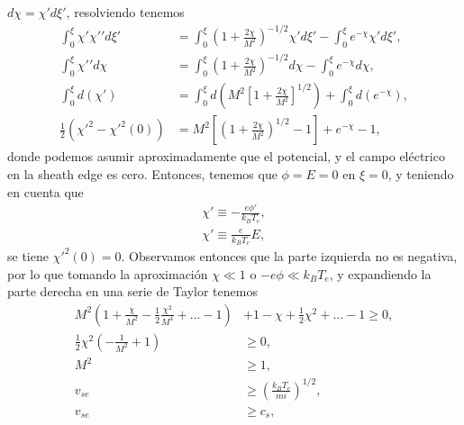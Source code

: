 \documentclass[../main.tex]{subfiles}
\begin{document}
    $d\chi = \chi\prime d\xi\prime$, resolviendo tenemos
    \begin{align}
        \int_0^{\xi}\chi\prime\chi\prime\prime d\xi\prime &= \int_0^{\xi} \left(1+\frac{2\chi}{M^2}\right)^{-1/2}\chi\prime d\xi\prime - \int_0^{\xi}e^{-\chi}\chi\prime d\xi\prime, \\
        \int_0^{\xi}\chi\prime\prime d\chi &= \int_0^{\xi} \left(1+\frac{2\chi}{M^2}\right)^{-1/2} d\chi - \int_0^{\xi}e^{-\chi} d\chi, \\
        \int_0^{\xi}d(\chi\prime) &= \int_0^{\xi} d\left(M^2\left[1+\frac{2\chi}{M^2}\right]^{1/2}\right)  + \int_0^{\xi}d\left(e^{-\chi}\right), \\
        \frac{1}{2}\left(\chi\prime^2-\chi\prime^2\left(0\right)\right) &= M^2\left[\left(1+\frac{2\chi}{M^2}\right)^{1/2} - 1\right] + e^{-\chi} - 1,
        \end{align}
    donde podemos asumir aproximadamente que el potencial, y el campo eléctrico en la sheath edge es cero. Entonces, tenemos que $\phi=E=0$ en $\xi=0$, y teniendo en cuenta que
    \begin{align}
        \chi\prime \equiv -\frac{e\phi\prime}{k_BT_e}, \\
        \chi\prime \equiv \frac{e}{k_BT_e}E,
    \end{align}
    se tiene $\chi\prime^2(0)=0$. Observamos entonces que la parte izquierda no es negativa, por lo que tomando la aproximación $\chi \ll 1$ o $-e\phi \ll k_BT_e$, y expandiendo la parte derecha en una serie de Taylor tenemos
    \begin{align}
        M^2\left(1+\frac{\chi}{M^2}-\frac{1}{2}\frac{\chi^2}{M^4}+...-1\right) &+ 1 - \chi + \frac{1}{2}\chi^2+...-1 \geq 0, \\
        \frac{1}{2}\chi^2\left(-\frac{1}{M^2}+1\right) &\geq 0, \\
        M^2 &\geq 1, \\
        v_{se} &\geq \left(\frac{k_BT_e}{mi}\right)^{1/2}, \\
       v_{se} &\geq c_s, \label{Bohm_condition}
    \end{align}
\end{document}
